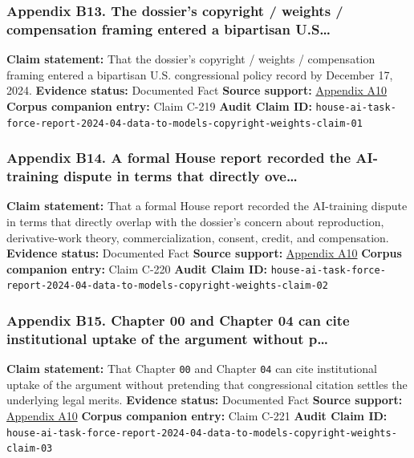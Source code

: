 \documentclass[
  american,
  11pt,
  letterpaper,
]{article}
\begin{document}
\subsubsection{Appendix B13. The dossier's copyright / weights /
compensation framing entered a bipartisan
U.S\ldots{}}\label{ch-04-appendix-b13-the-dossier-s-copyright-weights-compensation-framing-entered-a-bipartisan-u-s}

\textbf{Claim statement:} That the dossier's copyright / weights /
compensation framing entered a bipartisan U.S. congressional policy
record by December 17, 2024. \textbf{Evidence status:} Documented Fact
\textbf{Source support:}
\hyperref[ch-04-appendix-a10-bipartisan-house-task-force-report-on-artificial-intelligence]{Appendix
A10} \textbf{Corpus companion entry:} Claim C-219 \textbf{Audit Claim
ID:}
\texttt{house-ai-task-force-report-2024-04-data-to-models-copyright-weights-claim-01}

\subsubsection{Appendix B14. A formal House report recorded the
AI-training dispute in terms that directly
ove\ldots{}}\label{ch-04-appendix-b14-a-formal-house-report-recorded-the-ai-training-dispute-in-terms-that-directly-ove}

\textbf{Claim statement:} That a formal House report recorded the
AI-training dispute in terms that directly overlap with the dossier's
concern about reproduction, derivative-work theory, commercialization,
consent, credit, and compensation. \textbf{Evidence status:} Documented
Fact \textbf{Source support:}
\hyperref[ch-04-appendix-a10-bipartisan-house-task-force-report-on-artificial-intelligence]{Appendix
A10} \textbf{Corpus companion entry:} Claim C-220 \textbf{Audit Claim
ID:}
\texttt{house-ai-task-force-report-2024-04-data-to-models-copyright-weights-claim-02}

\subsubsection{Appendix B15. Chapter 00 and Chapter 04 can cite
institutional uptake of the argument without
p\ldots{}}\label{ch-04-appendix-b15-chapter-00-and-chapter-04-can-cite-institutional-uptake-of-the-argument-without-p}

\textbf{Claim statement:} That Chapter \texttt{00} and Chapter
\texttt{04} can cite institutional uptake of the argument without
pretending that congressional citation settles the underlying legal
merits. \textbf{Evidence status:} Documented Fact \textbf{Source
support:}
\hyperref[ch-04-appendix-a10-bipartisan-house-task-force-report-on-artificial-intelligence]{Appendix
A10} \textbf{Corpus companion entry:} Claim C-221 \textbf{Audit Claim
ID:}
\texttt{house-ai-task-force-report-2024-04-data-to-models-copyright-weights-claim-03}
\end{document}
